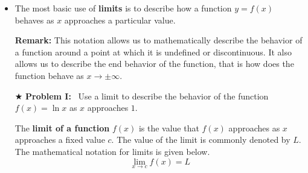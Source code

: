 \documentclass{ximera}  %
\begin{document}
\begin{itemize}
    
    
    
    \vspace{0.1in}
    
    \hspace{0.4in}
    
    
    \vspace{0.2in}
    \item The most basic use of \textbf{limits} is to
    describe how a function $y=f(x)$ behaves as $x$ approaches a
    particular value.
    
    
    
    \newpage
    
    \textbf{Remark:} This notation allows us to mathematically describe the behavior of a function around a point at
    which it is undefined or discontinuous.  It also allows us to describe the end behavior of the function, that is how does
    the function behave as $x \rightarrow \pm \infty$.
    
    
    \vspace{0.2in} \item[$\bigstar$] \textbf{Problem I:} \ Use a limit
    to describe the behavior of the function $f(x)=\ln x$ as $x$
    approaches $1.$




    \begin{definition}
    The \textbf{limit of a function} $f(x)$ is the value that $f(x)$
    approaches as $x$ approaches a fixed value $c.$  The value of
    the limit is commonly denoted by $L$.  The mathematical notation
    for limits is given below.
    \[ \lim_{x \rightarrow c} f(x) = L  \] 
      \end{definition}

\end{itemize}
\end{document}
